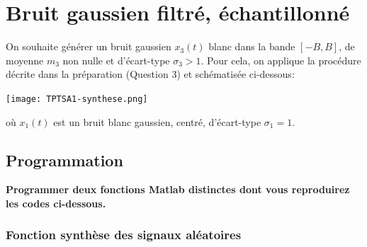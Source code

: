 \documentclass{article}
\begin{document}
\noindent{}
\vspace*{5mm}

\section{Bruit gaussien filtré, échantillonné}

On souhaite générer un bruit gaussien $x_3(t)$ blanc dans la bande $[-B,B]$, de moyenne $m_3$ non nulle et d'écart-type $\sigma_3 > 1$. Pour cela, on applique la procédure décrite dans la préparation (Question 3) et schématisée ci-dessous:\\

\begin{center}
\texttt{[image: TPTSA1-synthese.png]}
\end{center}

où $x_1(t)$ est un bruit blanc gaussien, centré, d'écart-type $\sigma_1=1$.

\subsection{Programmation}

\textbf{Programmer deux fonctions Matlab distinctes dont vous reproduirez  les codes ci-dessous.}

\subsubsection{Fonction synthèse des signaux aléatoires}
\end{document}
